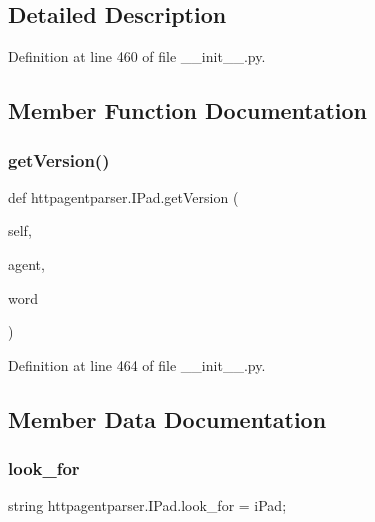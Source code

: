 \subsection{Detailed Description}


Definition at line 460 of file \+\_\+\+\_\+init\+\_\+\+\_\+.\+py.



\subsection{Member Function Documentation}
\hypertarget{classhttpagentparser_1_1_i_pad_abfa4759cb8824c2088a828e40f700381}{}\label{classhttpagentparser_1_1_i_pad_abfa4759cb8824c2088a828e40f700381} 
\subsubsection{\texorpdfstring{get\+Version()}{getVersion()}}
{\footnotesize\ttfamily def httpagentparser.\+I\+Pad.\+get\+Version (\begin{DoxyParamCaption}\item[{}]{self,  }\item[{}]{agent,  }\item[{}]{word }\end{DoxyParamCaption})}



Definition at line 464 of file \+\_\+\+\_\+init\+\_\+\+\_\+.\+py.



\subsection{Member Data Documentation}
\hypertarget{classhttpagentparser_1_1_i_pad_ac3081b11a94a968d144c8c8622fbcb72}{}\label{classhttpagentparser_1_1_i_pad_ac3081b11a94a968d144c8c8622fbcb72} 
\subsubsection{\texorpdfstring{look\+\_\+for}{look\_for}}
{\footnotesize\ttfamily string httpagentparser.\+I\+Pad.\+look\+\_\+for = \textquotesingle{}i\+Pad;\textquotesingle{}\hspace{0.3cm}{\ttfamily [static]}}



